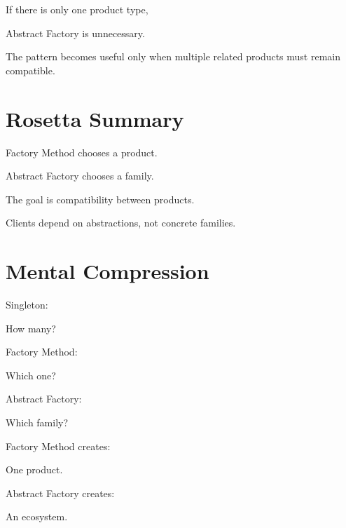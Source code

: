 \documentclass[11pt,a4paper]{book}
\begin{document}
\begin{trap}

If there is only one product type,

Abstract Factory is unnecessary.

\end{trap}

The pattern becomes useful only when
multiple related products must remain compatible.


\section{Rosetta Summary}

\begin{rosettarule}

Factory Method chooses a product.

\end{rosettarule}

\begin{rosettarule}

Abstract Factory chooses a family.

\end{rosettarule}

\begin{rosettarule}

The goal is compatibility between products.

\end{rosettarule}

\begin{rosettarule}

Clients depend on abstractions,
not concrete families.

\end{rosettarule}


\section{Mental Compression}

\begin{compressionbox}

Singleton:

How many?

Factory Method:

Which one?

Abstract Factory:

Which family?

Factory Method creates:

One product.

Abstract Factory creates:

An ecosystem.

\end{compressionbox}
\end{document}
